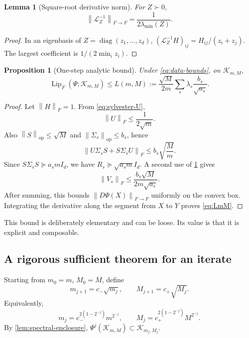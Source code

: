 \documentclass[11pt]{article}
\newtheorem{proposition}[theorem]{Proposition}
\newtheorem{lemma}[theorem]{Lemma}
\theoremstyle{definition}
\newcommand{\Id}{I_d}
\newcommand{\diag}{\operatorname{diag}}
\newcommand{\Lip}{\operatorname{Lip}}
\newcommand{\cK}{\mathcal K}
\newcommand{\cL}{\mathcal L}
\newcommand{\norm}[1]{\left\lVert #1\right\rVert}
\begin{document}
\begin{lemma}[Square-root derivative norm]\label{lem:sqrt-deriv-bound}
For $Z\succ0$,
\begin{equation}\label{eq:lyapunov-inverse-bound}
 \norm{\cL_Z^{-1}}_{F\to F}=\frac{1}{2\lambda_{\min}(Z)}.
\end{equation}
\end{lemma}

\begin{proof}
In an eigenbasis of $Z=\diag(z_1,\ldots,z_d)$,
$(\cL_Z^{-1}H)_{ij}=H_{ij}/(z_i+z_j)$.  The largest coefficient is
$1/(2\min_i z_i)$.
\end{proof}

\begin{proposition}[One-step analytic bound]\label{prop:one-step-bound}
Under \eqref{eq:data-bounds}, on $\cK_{m,M}$,
\begin{equation}\label{eq:LmM}
 \Lip_F(\Psi;\cK_{m,M})\leq
 L(m,M):=\frac{\sqrt M}{2m}
 \sum_s\lambda_s\frac{b_s}{\sqrt{a_s}}.
\end{equation}
\end{proposition}

\begin{proof}
Let $\norm{H}_F=1$.  From \eqref{eq:sylvester-U},
\[
 \norm U_F\leq\frac{1}{2\sqrt m}.
\]
Also $\norm S_{\mathrm{op}}\leq\sqrt M$ and
$\norm{\Sigma_s}_{\mathrm{op}}\leq b_s$, hence
\[
 \norm{U\Sigma_sS+S\Sigma_sU}_F
 \leq b_s\sqrt{\frac{M}{m}}.
\]
Since $S\Sigma_sS\succeq a_sm\Id$, we have
$R_s\succeq\sqrt{a_sm}\Id$.  A second use of
\cref{lem:sqrt-deriv-bound} gives
\[
 \norm{V_s}_F\leq
 \frac{b_s\sqrt M}{2m\sqrt{a_s}}.
\]
After summing, this bounds $\norm{D\Psi(X)}_{F\to F}$ uniformly on the convex
box.  Integrating the derivative along the segment from $X$ to $Y$ proves
\eqref{eq:LmM}.
\end{proof}

This bound is deliberately elementary and can be loose.  Its value is that it
is explicit and composable.

\subsection{A rigorous sufficient theorem for an iterate}

Starting from $m_0=m$, $M_0=M$, define
\begin{equation}\label{eq:box-recursion}
 m_{j+1}=c_-\sqrt{m_j},\qquad
 M_{j+1}=c_+\sqrt{M_j}.
\end{equation}
Equivalently,
\begin{equation}\label{eq:box-explicit}
 m_j=c_-^{2(1-2^{-j})}m^{2^{-j}},\qquad
 M_j=c_+^{2(1-2^{-j})}M^{2^{-j}}.
\end{equation}
By \cref{lem:spectral-enclosure},
$\Psi^j(\cK_{m,M})\subset\cK_{m_j,M_j}$.
\end{document}
